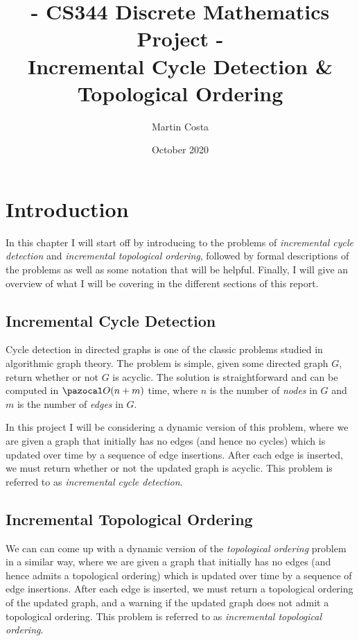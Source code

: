 \documentclass{report}
\title{- CS344 Discrete Mathematics Project - \\  Incremental Cycle Detection \& Topological Ordering}
\author{Martin Costa}
\date{October 2020}
\begin{document}
\maketitle

\chapter{Introduction}

In this chapter I will start off by introducing to the problems of \textit{incremental cycle detection} and \textit{incremental topological ordering}, followed by formal descriptions of the problems as well as some notation that will be helpful. Finally, I will give an overview of what I will be covering in the different sections of this report.

\section{Incremental Cycle Detection}

Cycle detection in directed graphs is one of the classic problems studied in algorithmic graph theory. The problem is simple, given some directed graph $G$, return whether or not $G$ is acyclic. The solution is straightforward and can be computed in $\pazocal O(n+m)$ time, where $n$ is the number of \textit{nodes} in $G$ and $m$ is the number of \textit{edges} in $G$.

In this project I will be considering a dynamic version of this problem, where we are given a graph that initially has no edges (and hence no cycles) which is updated over time by a sequence of edge insertions. After each edge is inserted, we must return whether or not the updated graph is acyclic. This problem is referred to as \textit{incremental cycle detection}.

\section{Incremental Topological Ordering}

We can can come up with a dynamic version of the \textit{topological ordering} problem in a similar way, where we are given a graph that initially has no edges (and hence admits a topological ordering) which is updated over time by a sequence of edge insertions. After each edge is inserted, we must return a topological ordering of the updated graph, and a warning if the updated graph does not admit a topological ordering. This problem is referred to as \textit{incremental topological ordering}.
\end{document}
